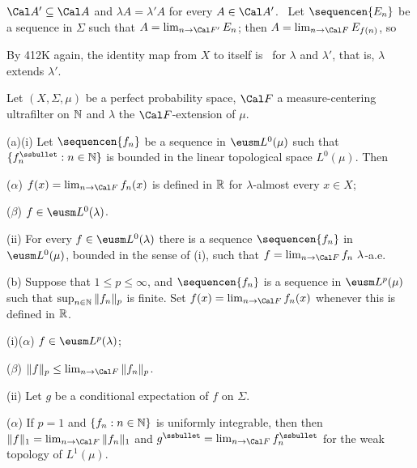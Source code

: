 {

\noindent $\Cal A'\subseteq\Cal A$ and $\lambda A=\lambda'A$ for every
$A\in\Cal A'$.   \Prf\ Let
$\sequencen{E_n}$ be a sequence in $\Sigma$ such that
$A=\lim_{n\to\Cal F'}E_n$;  then $A=\lim_{n\to\Cal F}E_{f(n)}$, so


\noindent By 412K again, the identity map from $X$ to itself is
\imp\ for $\lambda$ and $\lambda'$, that is, $\lambda$ extends $\lambda'$.
}%

 Let $(X,\Sigma,\mu)$ be a perfect probability
space, $\Cal F$ a measure-centering ultrafilter on $\Bbb N$ and $\lambda$
the $\Cal F$-extension of $\mu$.

(a)(i) Let $\sequencen{f_n}$ be a sequence in $\eusm L^0(\mu)$ such that
$\{f_n^{\ssbullet}:n\in\Bbb N\}$ is bounded in the linear topological space
$L^0(\mu)$.   Then

\qquad($\alpha$) $f(x)=\lim_{n\to\Cal F}f_n(x)$ is defined in $\Bbb R$
for $\lambda$-almost every $x\in X$;

\qquad($\beta$) $f\in\eusm L^0(\lambda)$.

\quad(ii) For every $f\in\eusm L^0(\lambda)$ there is a sequence
$\sequencen{f_n}$ in $\eusm L^0(\mu)$, bounded in the sense of (i), such
that $f=\lim_{n\to\Cal F}f_n\,\,\lambda$-a.e.

(b) Suppose that $1\le p\le\infty$, and
$\sequencen{f_n}$ is a sequence in
$\eusm L^p(\mu)$ such that $\sup_{n\in\Bbb N}\|f_n\|_p$ is finite.
Set $f(x)=\lim_{n\to\Cal F}f_n(x)$ whenever this is defined in $\Bbb R$.

\quad(i)($\alpha$) $f\in\eusm L^p(\lambda)$;

\qquad($\beta$) $\|f\|_p\le\lim_{n\to\Cal F}\|f_n\|_p$.

\quad(ii) Let $g$ be a conditional expectation of $f$ on $\Sigma$.

\qquad($\alpha$) If $p=1$ and $\{f_n:n\in\Bbb N\}$ is uniformly integrable, then
then $\|f\|_1=\lim_{n\to\Cal F}\|f_n\|_1$ and
$g^{\ssbullet}=\lim_{n\to\Cal F}f_n^{\ssbullet}$ for the weak topology
of $L^1(\mu)$.

